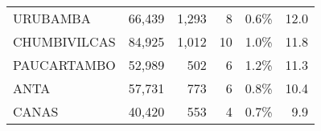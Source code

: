 \begin{tabular}{lrrrrr}
	\cellcolor[HTML]{FFFFC7}URUBAMBA                                   & 66,439                                                         & 1,293                                                                            & 8                                                                & 0.6\%                                                                  & 12.0                                                                                                                              \\
	\cellcolor[HTML]{FFFFC7}CHUMBIVILCAS                               & 84,925                                                         & 1,012                                                                            & 10                                                               & 1.0\%                                                                  & 11.8                                                                                                                              \\
	\cellcolor[HTML]{FFFFC7}PAUCARTAMBO                                & 52,989                                                         & 502                                                                              & 6                                                                & 1.2\%                                                                  & 11.3                                                                                                                              \\
	\cellcolor[HTML]{FFFFC7}ANTA                                       & 57,731                                                         & 773                                                                              & 6                                                                & 0.8\%                                                                  & 10.4                                                                                                                              \\
	\cellcolor[HTML]{FFFFC7}CANAS                                      & 40,420                                                         & 553                                                                              & 4                                                                & 0.7\%                                                                  & 9.9                                                                                                                               \\

\end{tabular}
